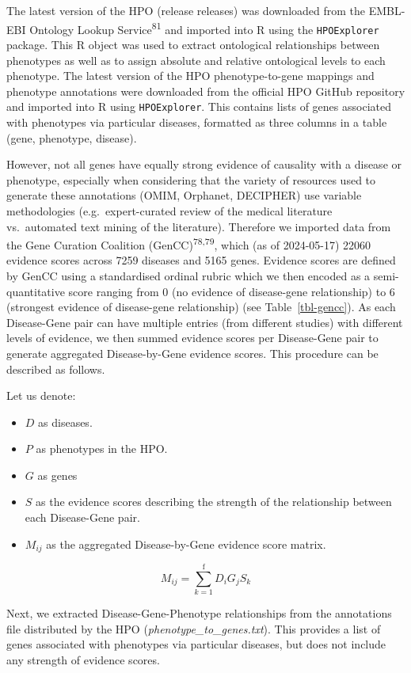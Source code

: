 \documentclass[
]{agujournal2019}
\begin{document}
The latest version of the HPO (release releases) was downloaded from the
EMBL-EBI Ontology Lookup Service\textsuperscript{81} and imported into R
using the \texttt{HPOExplorer} package. This R object was used to
extract ontological relationships between phenotypes as well as to
assign absolute and relative ontological levels to each phenotype. The
latest version of the HPO phenotype-to-gene mappings and phenotype
annotations were downloaded from the official HPO GitHub repository and
imported into R using \texttt{HPOExplorer}. This contains lists of genes
associated with phenotypes via particular diseases, formatted as three
columns in a table (gene, phenotype, disease).

However, not all genes have equally strong evidence of causality with a
disease or phenotype, especially when considering that the variety of
resources used to generate these annotations (OMIM, Orphanet, DECIPHER)
use variable methodologies (e.g.~expert-curated review of the medical
literature vs.~automated text mining of the literature). Therefore we
imported data from the Gene Curation Coalition
(GenCC)\textsuperscript{78,79}, which (as of 2024-05-17) 22060 evidence
scores across 7259 diseases and 5165 genes. Evidence scores are defined
by GenCC using a standardised ordinal rubric which we then encoded as a
semi-quantitative score ranging from 0 (no evidence of disease-gene
relationship) to 6 (strongest evidence of disease-gene relationship)
(see Table~\ref{tbl-gencc}). As each Disease-Gene pair can have multiple
entries (from different studies) with different levels of evidence, we
then summed evidence scores per Disease-Gene pair to generate aggregated
Disease-by-Gene evidence scores. This procedure can be described as
follows.

Let us denote:

\begin{itemize}
\item
  \(D\) as diseases.
\item
  \(P\) as phenotypes in the HPO.
\item
  \(G\) as genes
\item
  \(S\) as the evidence scores describing the strength of the
  relationship between each Disease-Gene pair.
\item
  \(M_{ij}\) as the aggregated Disease-by-Gene evidence score matrix.
\end{itemize}

\[
M_{ij} = \sum_{k=1}^{\text{f}} D_i G_j S_k
\]

Next, we extracted Disease-Gene-Phenotype relationships from the
annotations file distributed by the HPO
(\emph{phenotype\_to\_genes.txt}). This provides a list of genes
associated with phenotypes via particular diseases, but does not include
any strength of evidence scores.
\end{document}
